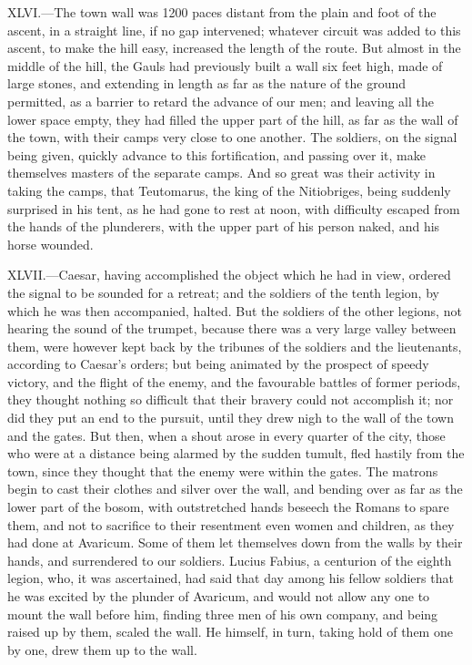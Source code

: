 XLVI.—The town wall was 1200 paces distant from the plain and foot of
the ascent, in a straight line, if no gap intervened; whatever circuit
was added to this ascent, to make the hill easy, increased the length of
the route. But almost in the middle of the hill, the Gauls had
previously built a wall six feet high, made of large stones, and
extending in length as far as the nature of the ground permitted, as a
barrier to retard the advance of our men; and leaving all the lower
space empty, they had filled the upper part of the hill, as far as the
wall of the town, with their camps very close to one another. The
soldiers, on the signal being given, quickly advance to this
fortification, and passing over it, make themselves masters of the
separate camps. And so great was their activity in taking the camps,
that Teutomarus, the king of the Nitiobriges, being suddenly surprised
in his tent, as he had gone to rest at noon, with difficulty escaped
from the hands of the plunderers, with the upper part of his person
naked, and his horse wounded.

XLVII.—Caesar, having accomplished the object which he had in view,
ordered the signal to be sounded for a retreat; and the soldiers of the
tenth legion, by which he was then accompanied, halted. But the soldiers
of the other legions, not hearing the sound of the trumpet, because
there was a very large valley between them, were however kept back by
the tribunes of the soldiers and the lieutenants, according to Caesar's
orders; but being animated by the prospect of speedy victory, and the
flight of the enemy, and the favourable battles of former periods, they
thought nothing so difficult that their bravery could not accomplish it;
nor did they put an end to the pursuit, until they drew nigh to the wall
of the town and the gates. But then, when a shout arose in every quarter
of the city, those who were at a distance being alarmed by the sudden
tumult, fled hastily from the town, since they thought that the enemy
were within the gates. The matrons begin to cast their clothes and
silver over the wall, and bending over as far as the lower part of the
bosom, with outstretched hands beseech the Romans to spare them, and not
to sacrifice to their resentment even women and children, as they had
done at Avaricum. Some of them let themselves down from the walls by
their hands, and surrendered to our soldiers. Lucius Fabius, a centurion
of the eighth legion, who, it was ascertained, had said that day among
his fellow soldiers that he was excited by the plunder of Avaricum, and
would not allow any one to mount the wall before him, finding three men
of his own company, and being raised up by them, scaled the wall. He
himself, in turn, taking hold of them one by one, drew them up to the
wall.

